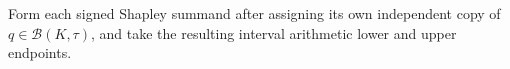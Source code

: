 Form each signed Shapley summand after assigning its own independent copy of \(q\in\mathcal B(K,\tau)\), and take the resulting interval arithmetic lower and upper endpoints.